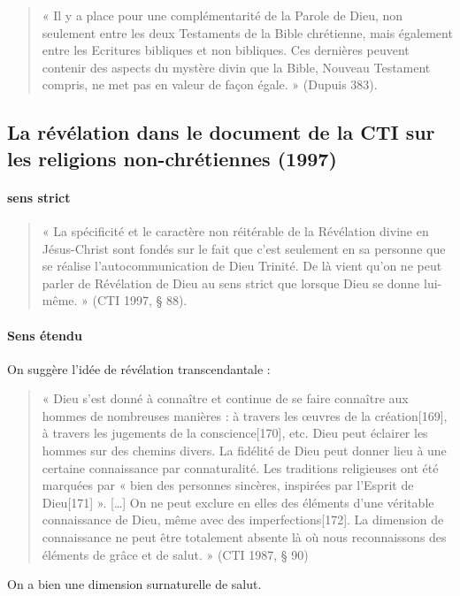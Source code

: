 \begin{quote}
    « Il y a place pour une complémentarité de la Parole de Dieu, non seulement entre les deux Testaments de la Bible chrétienne, mais également entre les Ecritures bibliques et  non bibliques. Ces dernières peuvent contenir des aspects du mystère divin que la Bible, Nouveau Testament compris, ne met pas en valeur de façon égale. » (Dupuis 383).
\end{quote} 


\subsection{La révélation dans le document de la CTI sur les religions non-chrétiennes (1997) }

\paragraph{sens strict}
\begin{quote}
    «  La spécificité et le caractère non réitérable de la Révélation divine en Jésus-Christ sont fondés sur le fait que c’est seulement en sa personne que se réalise l’autocommunication de Dieu Trinité. De là vient qu’on ne peut parler de Révélation de Dieu au sens strict que lorsque Dieu se donne lui-même. » (CTI 1997, § 88). 
\end{quote}

\paragraph{Sens étendu}
On suggère l'idée de révélation transcendantale : 
\begin{quote}
    « Dieu s’est donné à connaître et continue de se faire connaître aux hommes de nombreuses manières : à travers les œuvres de la création[169], à travers les jugements de la conscience[170], etc. Dieu peut éclairer les hommes sur des chemins divers. La fidélité de Dieu peut donner lieu à une certaine connaissance par connaturalité. Les traditions religieuses ont été marquées par « bien des personnes sincères, inspirées par l’Esprit de Dieu[171] ». […] On ne peut exclure en elles des éléments d’une véritable connaissance de Dieu, même avec des imperfections[172]. La dimension de connaissance ne peut être totalement absente là où nous reconnaissons des éléments de grâce et de salut. » (CTI 1987, § 90)
\end{quote}

On a bien une dimension surnaturelle de salut. 

